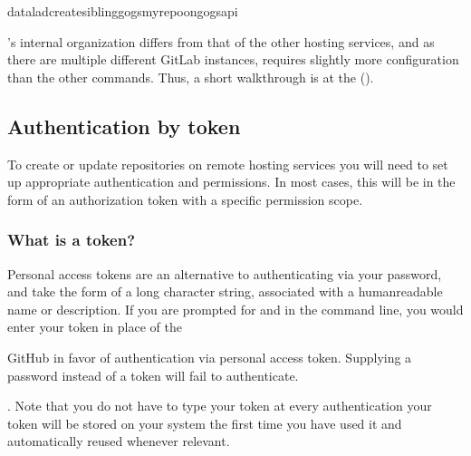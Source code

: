 \begin{sphinxVerbatim}[commandchars=\\\{\}]
dataladcreate\PYGZhy{}sibling\PYGZhy{}gogsmy\PYGZus{}repo\PYGZus{}on\PYGZus{}gogs\PYGZhy{}\PYGZhy{}api
\end{sphinxVerbatim}

\sphinxAtStartPar
{\hyperref[\detokenize{glossary:term-GitLab}]{}}’s internal organization differs from that of the other hosting services, and as there are multiple different GitLab instances,  requires slightly more configuration than the other commands.
Thus, a short walk\sphinxhyphen{}through is at the {\hyperref[\detokenize{basics/101-139-hostingservices:gitlab}]{}} ().


\subsection{Authentication by token}
\label{\detokenize{basics/101-139-hostingservices:authentication-by-token}}\label{\detokenize{basics/101-139-hostingservices:token}}
\sphinxAtStartPar
To create or update repositories on remote hosting services you will need to set up appropriate authentication and permissions.
In most cases, this will be in the form of an authorization token with a specific permission scope.


\subsubsection{What is a token?}
\label{\detokenize{basics/101-139-hostingservices:what-is-a-token}}
\sphinxAtStartPar
Personal access tokens are an alternative to authenticating via your password, and take the form of a long character string, associated with a human\sphinxhyphen{}readable name or description.
If you are prompted for  and  in the command line, you would enter your token in place of the %
\begin{footnote}\sphinxAtStartFootnote
GitHub  in favor of authentication via personal access token. Supplying a password instead of a token will fail to authenticate.
%
\end{footnote}.
Note that you do not have to type your token at every authentication \textendash{} your token will be stored on your system the first time you have used it and automatically reused whenever relevant.


